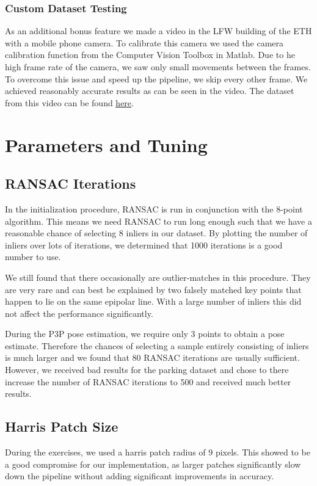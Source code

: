 \documentclass[11pt]{article}
\begin{document}
\subsubsection{Custom Dataset Testing}
As an additional bonus feature we made a video in the LFW building of the ETH with a mobile phone camera. To calibrate this camera we used the camera calibration function from the Computer Vision Toolbox in Matlab. Due to he high frame rate of the camera, we saw only small movements between the frames. To overcome this issue and speed up the pipeline, we skip every other frame. We achieved reasonably accurate results as can be seen in the video. The dataset from this video can be found \href{https://www.dropbox.com/sh/mhrpmllsdomer5p/AABb7Gz0JGaK-FXOYEMNzeGfa?dl=0}{\underline{here}}.

\section{Parameters and Tuning}
\subsection{RANSAC Iterations}
In the initialization procedure, RANSAC is run in conjunction with the 8-point algorithm. This means we need RANSAC to run long enough such that we have a reasonable chance of selecting 8 inliers in our dataset. By plotting the number of inliers over lots of iterations, we determined that 1000 iterations is a good number to use.

We still found that there occasionally are outlier-matches in this procedure. They are very rare and can best be explained by two falsely matched key points that happen to lie on the same epipolar line. With a large number of inliers this did not affect the performance significantly.

During the P3P pose estimation, we require only 3 points to obtain a pose estimate. Therefore the chances of selecting a sample entirely consisting of inliers is much larger and we found that 80 RANSAC iterations are usually sufficient. However, we received bad results for the parking dataset and chose to there increase the number of RANSAC iterations to 500 and received much better results.

\subsection{Harris Patch Size}
During the exercises, we used a harris patch radius of 9 pixels. This showed to be a good compromise for our implementation, as larger patches significantly slow down the pipeline without adding significant improvements in accuracy.
\end{document}
